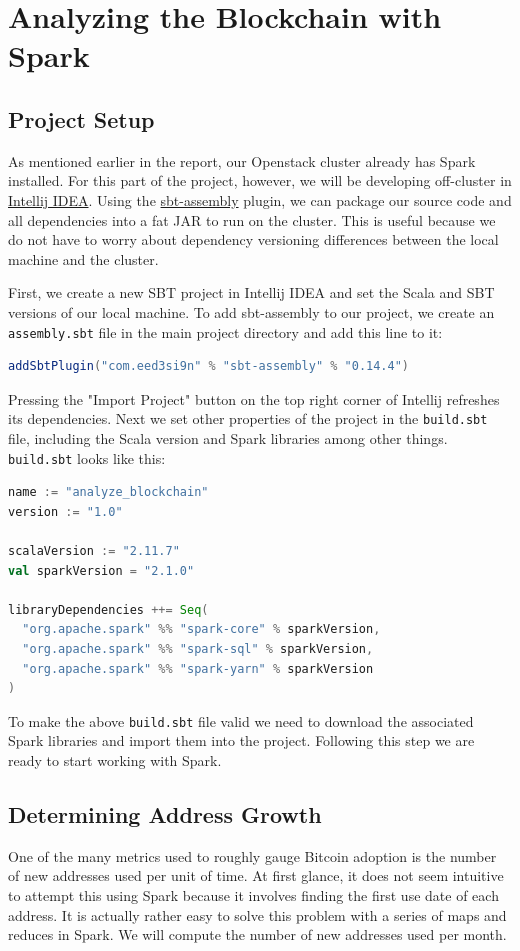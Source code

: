 \documentclass[9pt,twocolumn,twoside]{idsi}
\begin{document}
\section{Analyzing the Blockchain with Spark}
\subsection{Project Setup}
As mentioned earlier in the report, our Openstack cluster already has Spark installed. For this part of the project, however, we will be developing off-cluster in \href{https://www.jetbrains.com/idea/}{Intellij IDEA}. Using the \href{https://github.com/sbt/sbt-assembly}{sbt-assembly} plugin, we can package our source code and all dependencies into a fat JAR to run on the cluster. This is useful because we do not have to worry about dependency versioning differences between the local machine and the cluster.

First, we create a new SBT project in Intellij IDEA and set the Scala and SBT versions of our local machine. To add sbt-assembly to our project, we create an \lstinline{assembly.sbt} file in the main project directory and add this line to it:

\begin{lstlisting}[language=Scala]
addSbtPlugin("com.eed3si9n" % "sbt-assembly" % "0.14.4")
\end{lstlisting}

Pressing the "Import Project" button on the top right corner of Intellij refreshes its dependencies. Next we set other properties of the project in the \lstinline{build.sbt} file, including the Scala version and Spark libraries among other things. \lstinline{build.sbt} looks like this:

\begin{lstlisting}[language=Scala]
name := "analyze_blockchain"
version := "1.0"

scalaVersion := "2.11.7"
val sparkVersion = "2.1.0"

libraryDependencies ++= Seq(
  "org.apache.spark" %% "spark-core" % sparkVersion,
  "org.apache.spark" %% "spark-sql" % sparkVersion,
  "org.apache.spark" %% "spark-yarn" % sparkVersion
)
\end{lstlisting}

To make the above \lstinline{build.sbt} file valid we need to download the associated Spark libraries and import them into the project. Following this step we are ready to start working with Spark.

\subsection{Determining Address Growth}
One of the many metrics used to roughly gauge Bitcoin adoption is the number of new addresses used per unit of time. At first glance, it does not seem intuitive to attempt this using Spark because it involves finding the first use date of each address. It is actually rather easy to solve this problem with a series of maps and reduces in Spark. We will compute the number of new addresses used per month.
\end{document}
